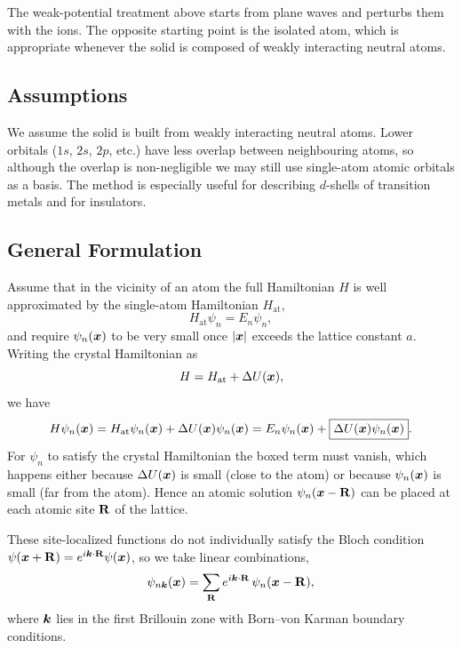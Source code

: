 The weak-potential treatment above starts from plane waves and perturbs them with the ions. The opposite starting point is the isolated atom, which is appropriate whenever the solid is composed of weakly interacting neutral atoms.

\subsection{Assumptions}

We assume the solid is built from weakly interacting neutral atoms. Lower orbitals ($1s$, $2s$, $2p$, etc.) have less overlap between neighbouring atoms, so although the overlap is non-negligible we may still use single-atom atomic orbitals as a basis. The method is especially useful for describing $d$-shells of transition metals and for insulators.

\subsection{General Formulation}

Assume that in the vicinity of an atom the full Hamiltonian $H$ is well approximated by the single-atom Hamiltonian $H_{\text{at}}$,
\begin{equation}
    H_{\text{at}} \psi_n = E_n \psi_n,
\end{equation}
and require $\psi_n(\bm{x})$ to be very small once $|\bm{x}|$ exceeds the lattice constant $a$. Writing the crystal Hamiltonian as
\begin{equation}
    H = H_{\text{at}} + \Delta U(\bm{x}),
\end{equation}
we have
\begin{equation}
    H \psi_n(\bm{x}) = H_{\text{at}} \psi_n(\bm{x}) + \Delta U(\bm{x}) \psi_n(\bm{x})
    = E_n \psi_n(\bm{x}) + \boxed{\Delta U(\bm{x})\psi_n(\bm{x})}.
\end{equation}
For $\psi_n$ to satisfy the crystal Hamiltonian the boxed term must vanish, which happens either because $\Delta U(\bm{x})$ is small (close to the atom) or because $\psi_n(\bm{x})$ is small (far from the atom). Hence an atomic solution $\psi_n(\lvect{x} - \cvect{R})$ can be placed at each atomic site $\cvect{R}$ of the lattice.

These site-localized functions do not individually satisfy the Bloch condition $\psi(\lvect{x}+\cvect{R}) = e^{i\lvect{k}\cdot\cvect{R}}\psi(\lvect{x})$, so we take linear combinations,
\begin{equation}
    \psi_{n\lvect{k}}(\lvect{x}) = \sum_{\cvect{R}} e^{i\lvect{k}\cdot\cvect{R}}\, \psi_n(\lvect{x} - \cvect{R}),
    \label{eq:bloch-tb-sum}
\end{equation}
where $\bm{k}$ lies in the first Brillouin zone with Born--von Karman boundary conditions.

